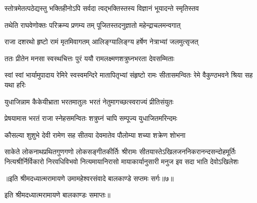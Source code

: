 \twolineshloka
{स्तोत्रमेतत्पठेद्यस्तु भक्तिहीनोऽपि सर्वदा}
{त्वद्भक्तिस्तस्य विज्ञानं भूयादन्ते स्मृतिस्तव} %

\twolineshloka
{तथेति राघवेणोक्तः परिक्रम्य प्रणम्य तम्}
{पूजितस्तदनुज्ञातो महेन्द्राचलमन्वगात्} %

\twolineshloka
{राजा दशरथो हृष्टो रामं मृतमिवागतम्}
{आलिङ्ग्यालिङ्ग्य हर्षेण नेत्राभ्यां जलमुत्सृजत्} %

\twolineshloka
{ततः प्रीतेन मनसा स्वस्थचित्तः पुरं ययौ}
{रामलक्ष्मणशत्रुघ्नभरता देवसम्मिताः} %

\threelineshloka
{स्वां स्वां भार्यामुपादाय रेमिरे स्वस्वमन्दिरे}
{मातापितृभ्यां संहृष्टो रामः सीतासमन्वितः}
{रेमे वैकुण्ठभवने श्रिया सह यथा हरिः} %

\twolineshloka
{युधाजिन्नाम कैकेयीभ्राता भरतमातुलः}
{भरतं नेतुमागच्छत्स्वराज्यं प्रीतिसंयुतः} %

\twolineshloka
{प्रेषयामास भरतं राजा स्नेहसमन्वितः}
{शत्रुघ्नं चापि सम्पूज्य युधाजितमरिन्दमः} %

\twolineshloka
{कौसल्या शुशुभे देवी रामेण सह सीतया}
{देवमातेव पौलोम्या शच्या शक्रेण शोभना} %

\fourlineindentedshloka
{साकेते लोकनाथप्रथितगुणगणो लोकसङ्गीतकीर्तिः}
{श्रीरामः सीतयास्तेऽखिलजननिकरानन्दसन्दोहमूर्तिः}
{नित्यश्रीर्निर्विकारो निरवधिविभवो नित्यमायानिरासो}
{मायाकार्यानुसारी मनुज इव सदा भाति देवोऽखिलेशः} %

{॥इति श्रीमदध्यात्मरामायणे उमामहेश्वरसंवादे
बालकाण्डे सप्तमः सर्गः॥७॥
}

इति श्रीमदध्यात्मरामायणे बालकाण्डः समाप्तः॥